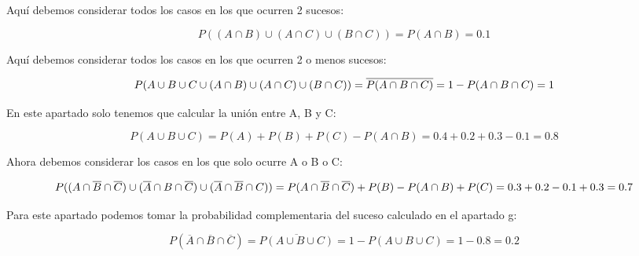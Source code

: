 \subproblem
Aquí debemos considerar todos los casos en los que ocurren 2 sucesos:

\begin{equation*}
    P((A \cap B) \cup (A \cap C) \cup ( B \cap C)) = P(A \cap B) = 0.1
\end{equation*}

\subproblem
Aquí debemos considerar todos los casos en los que ocurren 2 o menos sucesos:

\begin{equation*}
    P(A \cup B \cup C \cup (A \cap B) \cup (A \cap C) \cup ( B \cap C)) =\\ \overline{P(A \cap B \cap C)} = 1 - P(A \cap B \cap C) = 1
\end{equation*}

\subproblem
En este apartado solo tenemos que calcular la unión entre A, B y C:

\begin{equation*}
    P(A \cup B \cup C) = P(A) + P(B) + P(C) - P(A \cap B) = 0.4 + 0.2 + 0.3 - 0.1 = 0.8
\end{equation*}

\subproblem
Ahora debemos considerar los casos en los que solo ocurre A o B o C:

\begin{equation*}
    P((A \cap \overline{B} \cap \overline{C}) \cup (\overline{A} \cap B \cap \overline{C}) \cup (\overline{A} \cap \overline{B} \cap C)) = \\
    P(A \cap \overline{B} \cap \overline{C}) + P(B) - P(A \cap B) + P(C) = 0.3 + 0.2 - 0.1 + 0.3 = 0.7
\end{equation*}

\subproblem
Para este apartado podemos tomar la probabilidad complementaria del suceso calculado en el apartado g:

\begin{equation*}
    P(\overline{A} \cap \overline{B} \cap \overline{C}) = \overline{P(A \cup B \cup C)} = 1 - P(A \cup B \cup C) = 1 - 0.8 = 0.2
\end{equation*}
